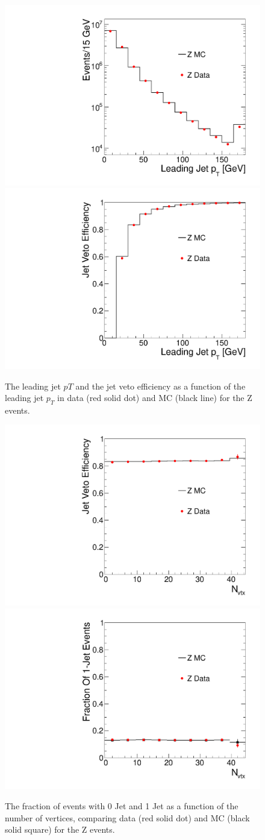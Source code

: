 \begin{figure}[!hbtp]
\centering
\includegraphics[width=.45\textwidth]{figures/ZjetpT.pdf}
\includegraphics[width=.45\textwidth]{figures/Zjetvetoeff.pdf}
\caption{The leading jet $pT$  and the jet veto efficiency as a function 
of the leading jet $p_T$  in data (red solid dot) and MC (black line) for the Z events. }
\label{fig:jetveto_z}
\end{figure}
\begin{figure}[!hbtp]
\centering
\includegraphics[width=.45\textwidth]{figures/Zjetvetoeff_vs_nvtx.pdf}
\includegraphics[width=.45\textwidth]{figures/Zonejeteff_vs_nvtx.pdf}
\caption{The fraction of events with 0 Jet  and 1 Jet  
as a function of the number of vertices, comparing data (red solid dot) and MC (black solid square) for the Z events. }
\label{fig:jetfrac_z}
\end{figure}

